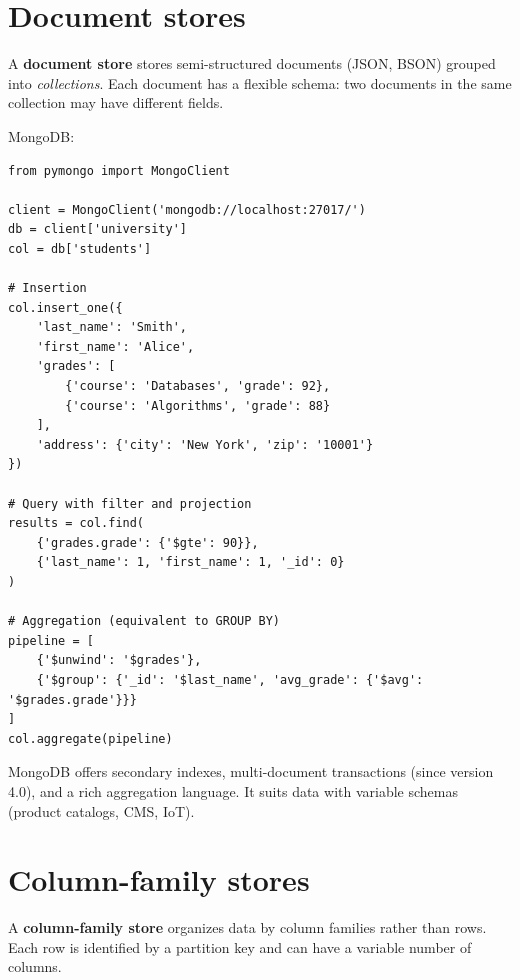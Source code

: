\section{Document stores}

\begin{definition}
A \textbf{document store} stores semi-structured documents (JSON, BSON)
grouped into \emph{collections}. Each document has a flexible schema: two
documents in the same collection may have different fields.
\end{definition}

\begin{example}
MongoDB:
\begin{verbatim}
from pymongo import MongoClient

client = MongoClient('mongodb://localhost:27017/')
db = client['university']
col = db['students']

# Insertion
col.insert_one({
    'last_name': 'Smith',
    'first_name': 'Alice',
    'grades': [
        {'course': 'Databases', 'grade': 92},
        {'course': 'Algorithms', 'grade': 88}
    ],
    'address': {'city': 'New York', 'zip': '10001'}
})

# Query with filter and projection
results = col.find(
    {'grades.grade': {'$gte': 90}},
    {'last_name': 1, 'first_name': 1, '_id': 0}
)

# Aggregation (equivalent to GROUP BY)
pipeline = [
    {'$unwind': '$grades'},
    {'$group': {'_id': '$last_name', 'avg_grade': {'$avg': '$grades.grade'}}}
]
col.aggregate(pipeline)
\end{verbatim}
\end{example}

\begin{remark}
MongoDB offers secondary indexes, multi-document transactions (since
version 4.0), and a rich aggregation language. It suits data with variable
schemas (product catalogs, CMS, IoT).
\end{remark}

\section{Column-family stores}

\begin{definition}
A \textbf{column-family store} organizes data by column families rather
than rows. Each row is identified by a partition key and can have a
variable number of columns.
\end{definition}

